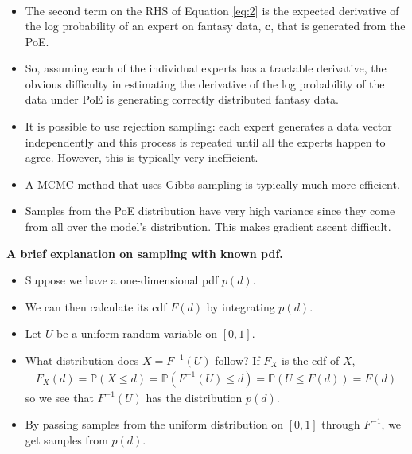 \documentclass[10pt]{article}
\newcommand{\PP}{\mathbb{P}}
\begin{document}
\begin{itemize}
\begin{align}
\end{align}
\item The second term on the RHS of Equation \eqref{eq:2} is the expected derivative of the log probability of an expert on fantasy data, $\mathbf{c}$, that is generated from the PoE.
\item So, assuming each of the individual experts has a tractable derivative, the obvious difficulty in estimating the derivative of the log probability of the data under PoE is generating correctly distributed fantasy data.
\item It is possible to use rejection sampling: each expert generates a data vector independently and this process is repeated until all the experts happen to agree. However, this is typically very inefficient.
\item A MCMC method that uses Gibbs sampling is typically much more efficient.
\item Samples from the PoE distribution have very high variance since they come from all over the model's distribution. This makes gradient ascent difficult.
\end{itemize}

\newpage

\textbf{A brief explanation on sampling with known pdf.}
\begin{itemize}
\item Suppose we have a one-dimensional pdf $p(d)$.
\item We can then calculate its cdf $F(d)$ by integrating $p(d)$.
\item Let $U$ be a uniform random variable on $[0,1]$.
\item What distribution does $X = F^{-1}(U)$ follow? If $F_X$ is the cdf of $X$,
\begin{align*}
F_X(d) = \PP(X \leq d) = \PP(F^{-1}(U) \leq d) = \PP(U \leq F(d)) = F(d)
\end{align*}
so we see that $F^{-1}(U)$ has the distribution $p(d)$.
\item By passing samples from the uniform distribution on $[0,1]$ through $F^{-1}$, we get samples from $p(d)$.
\end{itemize}
\end{document}
